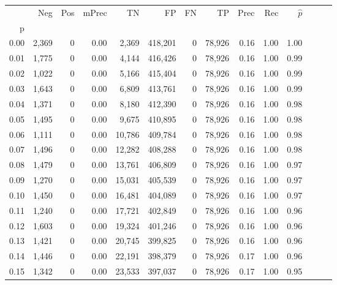 \begin{tabular}{rrrrrrrrrrrrrr}
\toprule
{} &     Neg &    Pos & mPrec &       TN &       FP &      FN &      TP &  Prec &   Rec & $\hat{p}$ \\
p    &         &        &       &          &          &         &         &       &       &           \\
\midrule
0.00 &   2,369 &      0 &  0.00 &    2,369 &  418,201 &       0 &  78,926 &  0.16 &  1.00 &      1.00 \\
0.01 &   1,775 &      0 &  0.00 &    4,144 &  416,426 &       0 &  78,926 &  0.16 &  1.00 &      0.99 \\
0.02 &   1,022 &      0 &  0.00 &    5,166 &  415,404 &       0 &  78,926 &  0.16 &  1.00 &      0.99 \\
0.03 &   1,643 &      0 &  0.00 &    6,809 &  413,761 &       0 &  78,926 &  0.16 &  1.00 &      0.99 \\
0.04 &   1,371 &      0 &  0.00 &    8,180 &  412,390 &       0 &  78,926 &  0.16 &  1.00 &      0.98 \\
0.05 &   1,495 &      0 &  0.00 &    9,675 &  410,895 &       0 &  78,926 &  0.16 &  1.00 &      0.98 \\
0.06 &   1,111 &      0 &  0.00 &   10,786 &  409,784 &       0 &  78,926 &  0.16 &  1.00 &      0.98 \\
0.07 &   1,496 &      0 &  0.00 &   12,282 &  408,288 &       0 &  78,926 &  0.16 &  1.00 &      0.98 \\
0.08 &   1,479 &      0 &  0.00 &   13,761 &  406,809 &       0 &  78,926 &  0.16 &  1.00 &      0.97 \\
0.09 &   1,270 &      0 &  0.00 &   15,031 &  405,539 &       0 &  78,926 &  0.16 &  1.00 &      0.97 \\
0.10 &   1,450 &      0 &  0.00 &   16,481 &  404,089 &       0 &  78,926 &  0.16 &  1.00 &      0.97 \\
0.11 &   1,240 &      0 &  0.00 &   17,721 &  402,849 &       0 &  78,926 &  0.16 &  1.00 &      0.96 \\
0.12 &   1,603 &      0 &  0.00 &   19,324 &  401,246 &       0 &  78,926 &  0.16 &  1.00 &      0.96 \\
0.13 &   1,421 &      0 &  0.00 &   20,745 &  399,825 &       0 &  78,926 &  0.16 &  1.00 &      0.96 \\
0.14 &   1,446 &      0 &  0.00 &   22,191 &  398,379 &       0 &  78,926 &  0.17 &  1.00 &      0.96 \\
0.15 &   1,342 &      0 &  0.00 &   23,533 &  397,037 &       0 &  78,926 &  0.17 &  1.00 &      0.95 \\

\end{tabular}
